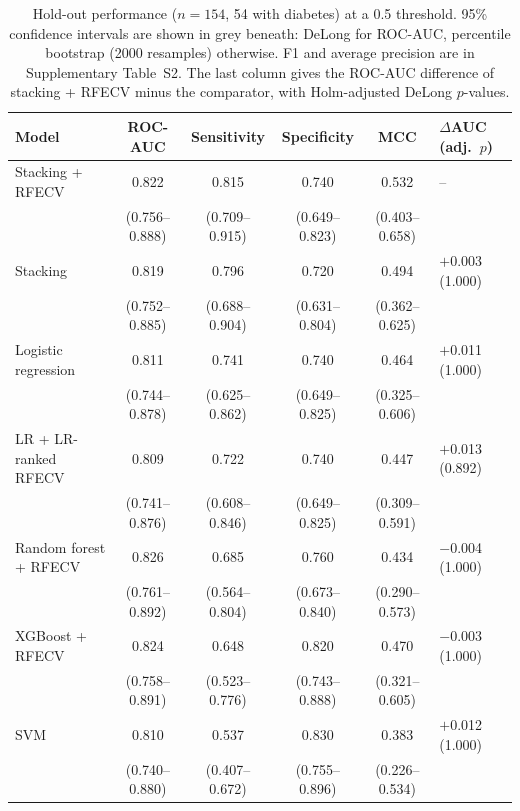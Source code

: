 \documentclass[preprint,12pt,authoryear=false]{elsarticle}
\begin{document}
\begin{table}[!htbp]
\centering
\caption{Hold-out performance ($n = 154$, 54 with diabetes) at a 0.5 threshold. 95\% confidence intervals are shown in grey beneath: DeLong for ROC-AUC, percentile bootstrap (2000 resamples) otherwise. F1 and average precision are in Supplementary Table~S2. The last column gives the ROC-AUC difference of stacking + RFECV minus the comparator, with Holm-adjusted DeLong $p$-values.}
\label{tab:holdout}
\scriptsize
\setlength{\tabcolsep}{3pt}
\begin{tabular}{lccccl}
\toprule
Model & ROC-AUC & Sensitivity & Specificity & MCC & $\Delta$AUC (adj.\ $p$) \\
\midrule
Stacking + RFECV & 0.822 & 0.815 & 0.740 & 0.532 & -- \\
 & {\scriptsize\color{gray}(0.756--0.888)} & {\scriptsize\color{gray}(0.709--0.915)} & {\scriptsize\color{gray}(0.649--0.823)} & {\scriptsize\color{gray}(0.403--0.658)} &  \\[2pt]
Stacking & 0.819 & 0.796 & 0.720 & 0.494 & $+$0.003 (1.000) \\
 & {\scriptsize\color{gray}(0.752--0.885)} & {\scriptsize\color{gray}(0.688--0.904)} & {\scriptsize\color{gray}(0.631--0.804)} & {\scriptsize\color{gray}(0.362--0.625)} &  \\[2pt]
Logistic regression & 0.811 & 0.741 & 0.740 & 0.464 & $+$0.011 (1.000) \\
 & {\scriptsize\color{gray}(0.744--0.878)} & {\scriptsize\color{gray}(0.625--0.862)} & {\scriptsize\color{gray}(0.649--0.825)} & {\scriptsize\color{gray}(0.325--0.606)} &  \\[2pt]
LR + LR-ranked RFECV & 0.809 & 0.722 & 0.740 & 0.447 & $+$0.013 (0.892) \\
 & {\scriptsize\color{gray}(0.741--0.876)} & {\scriptsize\color{gray}(0.608--0.846)} & {\scriptsize\color{gray}(0.649--0.825)} & {\scriptsize\color{gray}(0.309--0.591)} &  \\[2pt]
Random forest + RFECV & 0.826 & 0.685 & 0.760 & 0.434 & $-$0.004 (1.000) \\
 & {\scriptsize\color{gray}(0.761--0.892)} & {\scriptsize\color{gray}(0.564--0.804)} & {\scriptsize\color{gray}(0.673--0.840)} & {\scriptsize\color{gray}(0.290--0.573)} &  \\[2pt]
XGBoost + RFECV & 0.824 & 0.648 & 0.820 & 0.470 & $-$0.003 (1.000) \\
 & {\scriptsize\color{gray}(0.758--0.891)} & {\scriptsize\color{gray}(0.523--0.776)} & {\scriptsize\color{gray}(0.743--0.888)} & {\scriptsize\color{gray}(0.321--0.605)} &  \\[2pt]
SVM & 0.810 & 0.537 & 0.830 & 0.383 & $+$0.012 (1.000) \\
 & {\scriptsize\color{gray}(0.740--0.880)} & {\scriptsize\color{gray}(0.407--0.672)} & {\scriptsize\color{gray}(0.755--0.896)} & {\scriptsize\color{gray}(0.226--0.534)} &  \\[2pt]
\bottomrule
\end{tabular}
\end{table}
\end{document}
